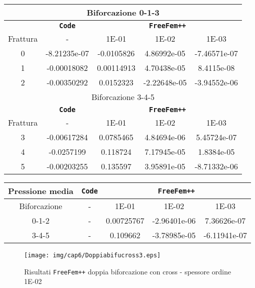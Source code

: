 \begin{center}
\begin{tabular}{|c|c|c|c|c|}
\hline
\multicolumn{5}{|c|}{Biforcazione 0-1-3}\\
\hline
 & \textbf{\texttt{Code}} & \multicolumn{3}{|c|}{\textbf{\texttt{FreeFem++}}} \\
\hline
\multicolumn{1}{|c|}{Frattura} & - &
\multicolumn{1}{|c|}{1E-01} & 1E-02 & 1E-03 \\
\hline
 0 & -8.21235e-07 & -0.0105826 & 4.86992e-05 & -7.46571e-07\\
 1 & -0.00018082 & 0.00114913 & 4.70438e-05 & 8.4115e-08\\  
 2 & -0.00350292 & 0.0152323 & -2.22648e-05 & -3.94552e-06\\
\hline
\multicolumn{5}{|c|}{Biforcazione 3-4-5}\\
\hline
 & \textbf{\texttt{Code}} & \multicolumn{3}{|c|}{\textbf{\texttt{FreeFem++}}} \\
\hline
\multicolumn{1}{|c|}{Frattura} & - &
\multicolumn{1}{|c|}{1E-01} & 1E-02 & 1E-03 \\
\hline
 3 & -0.00617284 & 0.0785465 & 4.84694e-06 & 5.45724e-07\\ 
 4 & -0.0257199 & 0.118724 & 7.17945e-05 & 1.8384e-05\\
 5 & -0.00203255 & 0.135597 & 3.95891e-05 & -8.71332e-06\\
\hline
\end{tabular}
\end{center}

\begin{center}
\begin{tabular}{|c|c|c|c|c|}
\hline
 Pressione media & \textbf{\texttt{Code}} & \multicolumn{3}{|c|}{\textbf{\texttt{FreeFem++}}} \\ 
\hline
\multicolumn{1}{|c|}{Biforcazione} & - &
\multicolumn{1}{|c|}{1E-01} & 1E-02 & 1E-03 \\
\hline
  0-1-2 & - & 0.00725767 & -2.96401e-06 & 7.36626e-07 \\
  3-4-5 & - & 0.109662 & -3.78985e-05 & -6.11941e-07 \\
\hline
\end{tabular}
\end{center}

\begin{center}
\begin{figure}[h!]
\centering
\texttt{[image: img/cap6/Doppiabifucross3.eps]}
\caption{Risultati \texttt{FreeFem++} doppia biforcazione con cross - spessore ordine 1E-02 }\label{DoppiaBifuCross1E-02}
\end{figure}
\end{center}